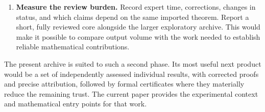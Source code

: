 \begin{enumerate}
\item \textbf{Measure the review burden.}
Record expert time, corrections, changes in status, and which claims
depend on the same imported theorem. Report a short, fully reviewed
core alongside the larger exploratory archive. This would make it
possible to compare output volume with the work needed to establish
reliable mathematical contributions.
\end{enumerate}

The present archive is suited to such a second phase. Its most useful
next product would be a set of independently assessed individual
results, with corrected proofs and precise attribution, followed by
formal certificates where they materially reduce the remaining trust.
The current paper provides the experimental context and mathematical
entry points for that work.
